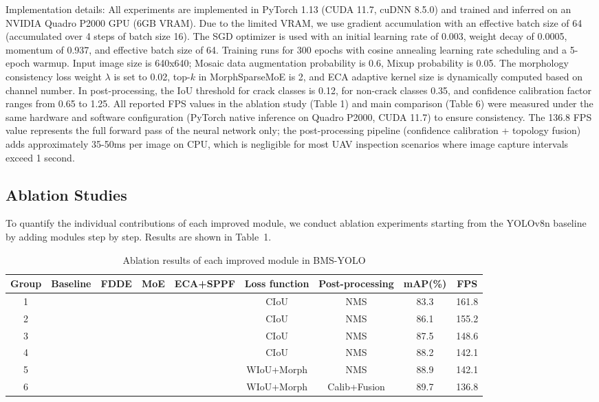 \documentclass[twocolumn]{sn-jnl}
\begin{document}
	Implementation details: All experiments are implemented in PyTorch 1.13 (CUDA 11.7, cuDNN 8.5.0) and trained and inferred on an NVIDIA Quadro P2000 GPU (6GB VRAM). Due to the limited VRAM, we use gradient accumulation with an effective batch size of 64 (accumulated over 4 steps of batch size 16). The SGD optimizer is used with an initial learning rate of 0.003, weight decay of 0.0005, momentum of 0.937, and effective batch size of 64. Training runs for 300 epochs with cosine annealing learning rate scheduling and a 5-epoch warmup. Input image size is 640x640; Mosaic data augmentation probability is 0.6, Mixup probability is 0.05. The morphology consistency loss weight \(\lambda\) is set to 0.02, top-\(k\) in MorphSparseMoE is 2, and ECA adaptive kernel size is dynamically computed based on channel number. In post-processing, the IoU threshold for crack classes is 0.12, for non-crack classes 0.35, and confidence calibration factor ranges from 0.65 to 1.25. All reported FPS values in the ablation study (Table 1) and main comparison (Table 6) were measured under the same hardware and software configuration (PyTorch native inference on Quadro P2000, CUDA 11.7) to ensure consistency. The 136.8 FPS value represents the full forward pass of the neural network only; the post-processing pipeline (confidence calibration + topology fusion) adds approximately 35-50ms per image on CPU, which is negligible for most UAV inspection scenarios where image capture intervals exceed 1 second.
	
	\subsection{Ablation Studies}
	To quantify the individual contributions of each improved module, we conduct ablation experiments starting from the YOLOv8n baseline by adding modules step by step. Results are shown in Table~1.
	
	\begin{table}[htbp]
		\centering
		\caption{Ablation results of each improved module in BMS-YOLO}
		\begin{tabular}{ccccccccc}
			\toprule
			Group & Baseline & FDDE & MoE & ECA+SPPF & Loss function & Post-processing & mAP(\%) & FPS \\
			\midrule
			1 & \checkmark & & & & CIoU & NMS & 83.3 & 161.8 \\
			2 & \checkmark & \checkmark & & & CIoU & NMS & 86.1 & 155.2 \\
			3 & \checkmark & \checkmark & \checkmark & & CIoU & NMS & 87.5 & 148.6 \\
			4 & \checkmark & \checkmark & \checkmark & \checkmark & CIoU & NMS & 88.2 & 142.1 \\
			5 & \checkmark & \checkmark & \checkmark & \checkmark & WIoU+Morph & NMS & 88.9 & 142.1 \\
			6 & \checkmark & \checkmark & \checkmark & \checkmark & WIoU+Morph & Calib+Fusion & 89.7 & 136.8 \\
			\bottomrule
		\end{tabular}
		\label{tab:ablation}
	\end{table}
	
\end{document}
